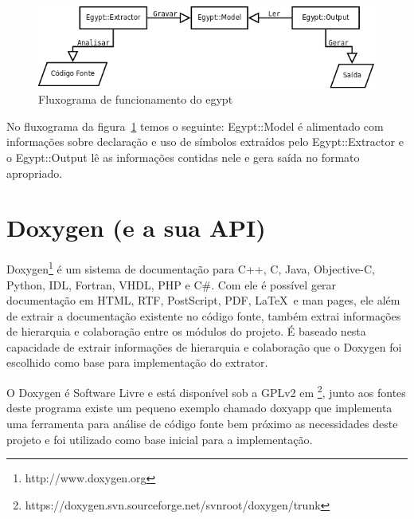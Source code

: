\begin{figure}[h]
\center
\includegraphics[scale=0.4]{imagens/egypt-fluxogram}
\caption{Fluxograma de funcionamento do egypt}
\label{egypt-fluxogram}
\end{figure}


No fluxograma da figura~\ref{egypt-fluxogram} temos o seguinte: Egypt::Model é
alimentado com informações sobre declaração e uso de símbolos extraídos pelo
Egypt::Extractor e o Egypt::Output lê as informações contidas nele e gera saída
no formato apropriado.

\section{Doxygen (e a sua API)}

Doxygen\footnote{http://www.doxygen.org} é um sistema de documentação para C++,
C, Java, Objective-C, Python, IDL,
Fortran, VHDL, PHP e C\#. Com ele é possível gerar documentação em
HTML, RTF,
PostScript, PDF, \LaTeX\ e man pages, ele
além de extrair a documentação existente no código fonte, também extrai
informações de hierarquia e colaboração entre os módulos do projeto. É baseado
nesta capacidade de extrair informações de hierarquia e colaboração que o
Doxygen foi escolhido como base para implementação do extrator.

O Doxygen é Software Livre e está disponível sob a GPLv2 em
\footnote{https://doxygen.svn.sourceforge.net/svnroot/doxygen/trunk}, junto aos
fontes deste programa existe um pequeno exemplo chamado doxyapp que implementa
uma ferramenta para análise de código fonte bem próximo as necessidades deste
projeto e foi utilizado como base inicial para a implementação.

